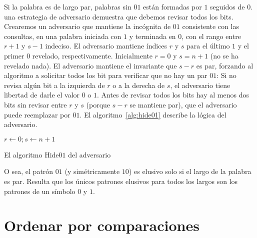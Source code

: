   Si la palabra es de largo par,
  palabras sin \(01\) están formadas por \(1\) seguidos de \(0\).
  una estrategia de adversario demuestra que debemos revisar todos los bits.
  Crearemos un adversario que mantiene la incógnita de \(01\)
  consistente con las consultas,
  en una palabra iniciada con \(1\) y terminada en \(0\),
  con el rango entre \(r + 1\) y \(s - 1\) indeciso.
  El adversario mantiene índices \(r\) y \(s\)
  para el último \(1\) y el primer \(0\) revelado,
  respectivamente.
  Inicialmente \(r = 0\) y \(s = n + 1\)
  (no se ha revelado nada).
  El adversario mantiene el invariante que \(s - r\) es par,
  forzando al algoritmo
  a solicitar todos los bit para verificar que no hay un par \(01\):
  Si no revisa algún bit a la izquierda de \(r\) o
  a la derecha de \(s\),
  el adversario tiene libertad de darle el valor \(0\) o \(1\).
  Antes de revisar todos los bits
  hay al menos dos bits sin revisar entre \(r\) y \(s\)
  (porque \(s - r\) se mantiene par),
  que el adversario puede reemplazar por \(01\).
  El algoritmo~\ref{alg:hide01} describe la lógica del adversario.
  \begin{algorithm}
    \DontPrintSemicolon

    \(r \gets 0; s \leftarrow n + 1\) \;
    \caption{El algoritmo \(\mathrm{Hide01}\) del adversario}
    \label{alg:hide01}
  \end{algorithm}

  O sea,
  el patrón \(01\)
  (y simétricamente \(10\))
  es elusivo solo si el largo de la palabra es par.
  Resulta que los únicos patrones elusivos para todos los largos
  son los patrones de un símbolo \(0\) y \(1\).

\section{Ordenar por comparaciones}
\label{sec:comparison-sort-bound}

